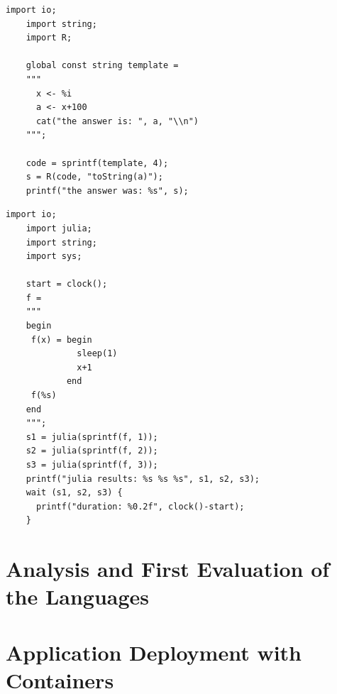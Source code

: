 \begin{enumerate}
	\begin{lstlisting}[basicstyle=\ttfamily, tabsize=3, frame=single, caption=Call of R code by a Swift application\label{lst:swift_Rswift}]
	import io;
	import string;
	import R;

	global const string template =
	"""
	  x <- %i
	  a <- x+100
	  cat("the answer is: ", a, "\\n")
	""";

	code = sprintf(template, 4);
	s = R(code, "toString(a)");
	printf("the answer was: %s", s);
	\end{lstlisting}


	\begin{lstlisting}[basicstyle=\ttfamily, tabsize=3, frame=single, caption=Call of  Julia code by a Swift application\label{lst:swift_juliaswift}]
	import io;
	import julia;
	import string;
	import sys;

	start = clock();
	f =
	"""
	begin
	 f(x) = begin
	          sleep(1)
	          x+1
	        end
	 f(%s)
	end
	""";
	s1 = julia(sprintf(f, 1));
	s2 = julia(sprintf(f, 2));
	s3 = julia(sprintf(f, 3));
	printf("julia results: %s %s %s", s1, s2, s3);
	wait (s1, s2, s3) {
	  printf("duration: %0.2f", clock()-start);
	}
	\end{lstlisting}
\end{enumerate}

\section{Analysis and First Evaluation of the Languages}

\section{Application Deployment with Containers}
